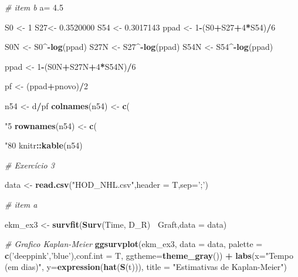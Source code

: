 \documentclass[]{article}
\newenvironment{Shaded}{\begin{snugshade}}{\end{snugshade}}
\newcommand{\KeywordTok}[1]{\textcolor[rgb]{0.13,0.29,0.53}{\textbf{#1}}}
\newcommand{\DataTypeTok}[1]{\textcolor[rgb]{0.13,0.29,0.53}{#1}}
\newcommand{\DecValTok}[1]{\textcolor[rgb]{0.00,0.00,0.81}{#1}}
\newcommand{\FloatTok}[1]{\textcolor[rgb]{0.00,0.00,0.81}{#1}}
\newcommand{\StringTok}[1]{\textcolor[rgb]{0.31,0.60,0.02}{#1}}
\newcommand{\CommentTok}[1]{\textcolor[rgb]{0.56,0.35,0.01}{\textit{#1}}}
\newcommand{\OperatorTok}[1]{\textcolor[rgb]{0.81,0.36,0.00}{\textbf{#1}}}
\newcommand{\NormalTok}[1]{#1}
\begin{document}
\begin{Shaded}
\begin{Highlighting}[]
{{{{{{{{{\CommentTok{# item b}
\NormalTok{a=}\StringTok{ }\FloatTok{4.5}

\NormalTok{S0 <-}\StringTok{ }\DecValTok{1}
\NormalTok{S27<-}\StringTok{ }\FloatTok{0.3520000}
\NormalTok{S54 <-}\StringTok{ }\FloatTok{0.3017143}
\NormalTok{ppad <-}\StringTok{ }\DecValTok{1}\OperatorTok{-}\NormalTok{(S0}\OperatorTok{+}\NormalTok{S27}\OperatorTok{+}\DecValTok{4}\OperatorTok{*}\NormalTok{S54)}\OperatorTok{/}\DecValTok{6}

\NormalTok{S0N <-}\StringTok{ }\NormalTok{S0}\OperatorTok{^-}\KeywordTok{log}\NormalTok{(ppad)}
\NormalTok{S27N <-}\StringTok{ }\NormalTok{S27}\OperatorTok{^-}\KeywordTok{log}\NormalTok{(ppad)}
\NormalTok{S54N <-}\StringTok{ }\NormalTok{S54}\OperatorTok{^-}\KeywordTok{log}\NormalTok{(ppad)}

\NormalTok{ppad <-}\StringTok{ }\DecValTok{1}\OperatorTok{-}\NormalTok{(S0N}\OperatorTok{+}\NormalTok{S27N}\OperatorTok{+}\DecValTok{4}\OperatorTok{*}\NormalTok{S54N)}\OperatorTok{/}\DecValTok{6}

\NormalTok{pf <-}\StringTok{ }\NormalTok{(ppad}\OperatorTok{+}\NormalTok{pnovo)}\OperatorTok{/}\DecValTok{2}

\NormalTok{n54 <-}\StringTok{ }\NormalTok{d}\OperatorTok{/}\NormalTok{pf}
\KeywordTok{colnames}\NormalTok{(n54) <-}\StringTok{ }\KeywordTok{c}\NormalTok{(}\StringTok{"5%
\KeywordTok{rownames}\NormalTok{(n54) <-}\StringTok{ }\KeywordTok{c}\NormalTok{(}\StringTok{"80%
\NormalTok{knitr}\OperatorTok{::}\KeywordTok{kable}\NormalTok{(n54)}

\CommentTok{# Exercício 3}

\NormalTok{data <-}\StringTok{ }\KeywordTok{read.csv}\NormalTok{(}\StringTok{"HOD_NHL.csv"}\NormalTok{,}\DataTypeTok{header =}\NormalTok{ T,}\DataTypeTok{sep=}\StringTok{';'}\NormalTok{)}

\CommentTok{# item a}

\NormalTok{ekm_ex3 <-}\StringTok{ }\KeywordTok{survfit}\NormalTok{(}\KeywordTok{Surv}\NormalTok{(Time, D_R)}\OperatorTok{~}\StringTok{ }\NormalTok{Graft,}\DataTypeTok{data =}\NormalTok{ data)}

\CommentTok{# Grafico Kaplan-Meier}
\KeywordTok{ggsurvplot}\NormalTok{(ekm_ex3, }\DataTypeTok{data =}\NormalTok{ data, }\DataTypeTok{palette =} \KeywordTok{c}\NormalTok{(}\StringTok{'deeppink'}\NormalTok{,}\StringTok{'blue'}\NormalTok{),}\DataTypeTok{conf.int =}\NormalTok{ T,}
           \DataTypeTok{ggtheme=}\KeywordTok{theme_gray}\NormalTok{()) }\OperatorTok{+}\StringTok{ }
\StringTok{  }\KeywordTok{labs}\NormalTok{(}\DataTypeTok{x=}\StringTok{"Tempo (em dias)"}\NormalTok{,}
       \DataTypeTok{y=}\KeywordTok{expression}\NormalTok{(}\KeywordTok{hat}\NormalTok{(}\KeywordTok{S}\NormalTok{(t))),}
       \DataTypeTok{title =} \StringTok{"Estimativas de Kaplan-Meier"}\NormalTok{) }

}}}}}}}}}}}
\end{Highlighting}
\end{Shaded}
\end{document}
